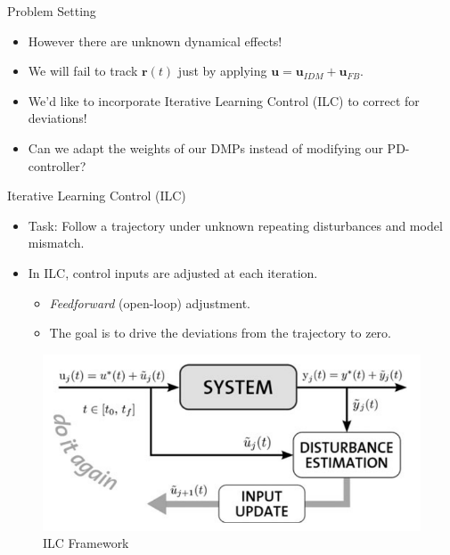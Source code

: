 \documentclass[handout]{beamer}
\newcommand{\traj}{\mathbf{r}} %
\newcommand{\sysInput}{\mathbf{u}} %
\begin{document}
%
\begin{frame}{Problem Setting}
\begin{itemize}	
\item However there are unknown dynamical effects! \pause
\item We will fail to track $\traj(t)$ just by applying $\sysInput = \sysInput_{IDM} + \sysInput_{FB}$. \pause
\item We'd like to incorporate Iterative Learning Control (ILC) to correct for deviations! \pause
\item Can we adapt the weights of our DMPs instead of modifying our PD-controller?
\end{itemize}
\end{frame}
%
\begin{frame}{Iterative Learning Control (ILC)}
\begin{itemize}
\item Task: Follow a trajectory under unknown repeating disturbances and model mismatch. \cite{Survey} \pause
\item In ILC, control inputs are adjusted at each iteration. \pause
	\begin{itemize}
	\item \emph{Feedforward} (open-loop) adjustment. \pause
	\item The goal is to drive the deviations from the trajectory to zero. \pause
	\end{itemize}
\end{itemize}
\begin{figure}
\center
\includegraphics[scale=0.25]{ilc_framework}			
\caption{ILC Framework \cite{ILC_Angela}}
\end{figure}
\end{frame}
%
\end{document}

